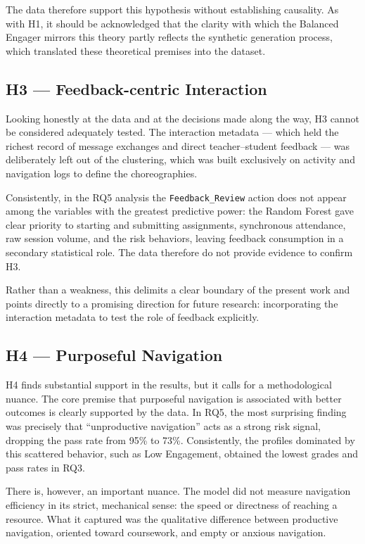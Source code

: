 The data therefore support this hypothesis without establishing causality. As with H1, it should be acknowledged that the clarity with which the Balanced Engager mirrors this theory partly reflects the synthetic generation process, which translated these theoretical premises into the dataset.

\subsection{H3 --- Feedback-centric Interaction}

Looking honestly at the data and at the decisions made along the way, H3 cannot be considered adequately tested. The interaction metadata --- which held the richest record of message exchanges and direct teacher--student feedback --- was deliberately left out of the clustering, which was built exclusively on activity and navigation logs to define the choreographies.

Consistently, in the RQ5 analysis the \texttt{Feedback\_Review} action does not appear among the variables with the greatest predictive power: the Random Forest gave clear priority to starting and submitting assignments, synchronous attendance, raw session volume, and the risk behaviors, leaving feedback consumption in a secondary statistical role. The data therefore do not provide evidence to confirm H3.

Rather than a weakness, this delimits a clear boundary of the present work and points directly to a promising direction for future research: incorporating the interaction metadata to test the role of feedback explicitly.

\subsection{H4 --- Purposeful Navigation}

H4 finds substantial support in the results, but it calls for a methodological nuance. The core premise that purposeful navigation is associated with better outcomes is clearly supported by the data. In RQ5, the most surprising finding was precisely that ``unproductive navigation'' acts as a strong risk signal, dropping the pass rate from 95\% to 73\%. Consistently, the profiles dominated by this scattered behavior, such as Low Engagement, obtained the lowest grades and pass rates in RQ3.

There is, however, an important nuance. The model did not measure navigation efficiency in its strict, mechanical sense: the speed or directness of reaching a resource. What it captured was the qualitative difference between productive navigation, oriented toward coursework, and empty or anxious navigation.

